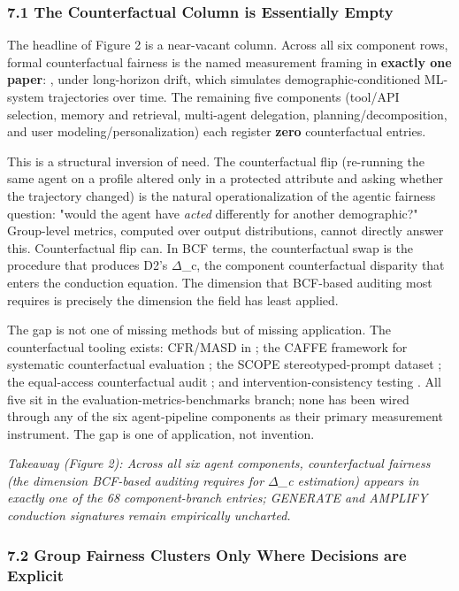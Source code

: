 \documentclass[10pt]{article}
\begin{document}
\subsubsection*{7.1 The Counterfactual Column is Essentially Empty}

The headline of Figure 2 is a near-vacant column. Across all six component rows, formal counterfactual fairness is the named measurement framing in \textbf{exactly one paper}: \cite{she2025fairsense}, under long-horizon drift, which simulates demographic-conditioned ML-system trajectories over time. The remaining five components (tool/API selection, memory and retrieval, multi-agent delegation, planning/decomposition, and user modeling/personalization) each register \textbf{zero} counterfactual entries.

This is a structural inversion of need. The counterfactual flip (re-running the same agent on a profile altered only in a protected attribute and asking whether the trajectory changed) is the natural operationalization of the agentic fairness question: "would the agent have \emph{acted} differently for another demographic?" Group-level metrics, computed over output distributions, cannot directly answer this. Counterfactual flip can. In BCF terms, the counterfactual swap is the procedure that produces D2's $\Delta$\_c, the component counterfactual disparity that enters the conduction equation. The dimension that BCF-based auditing most requires is precisely the dimension the field has least applied.

The gap is not one of missing methods but of missing application. The counterfactual tooling exists: CFR/MASD in \cite{mayilvaghanan2026counterfactual}; the CAFFE framework for systematic counterfactual evaluation \cite{parziale2025systematic}; the SCOPE stereotyped-prompt dataset \cite{parziale2026scope}; the equal-access counterfactual audit \cite{amirimargavi2026equal}; and intervention-consistency testing \cite{basu2026names}. All five sit in the evaluation-metrics-benchmarks branch; none has been wired through any of the six agent-pipeline components as their primary measurement instrument. The gap is one of application, not invention.

\emph{Takeaway (Figure 2): Across all six agent components, counterfactual fairness (the dimension BCF-based auditing requires for $\Delta$\_c estimation) appears in exactly one of the 68 component-branch entries; GENERATE and AMPLIFY conduction signatures remain empirically uncharted.}

\subsubsection*{7.2 Group Fairness Clusters Only Where Decisions are Explicit}
\end{document}
